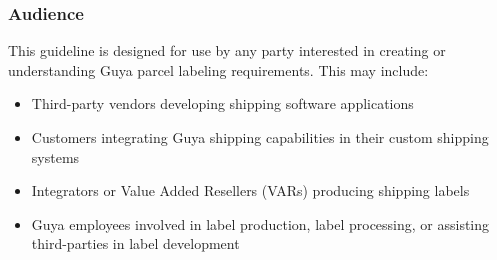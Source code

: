 \begin{appendices}
\subsubsection{Audience}
This guideline is designed for use by any party interested in creating or understanding Guya parcel labeling requirements. This may include:
\begin{itemize}
	\item Third-party vendors developing shipping software applications
	\item Customers integrating Guya shipping capabilities in their custom shipping systems
	\item Integrators or Value Added Resellers (VARs) producing shipping labels
	\item Guya employees involved in label production, label processing, or assisting third-parties in label development
\end{itemize}


  
  

\end{appendices}
